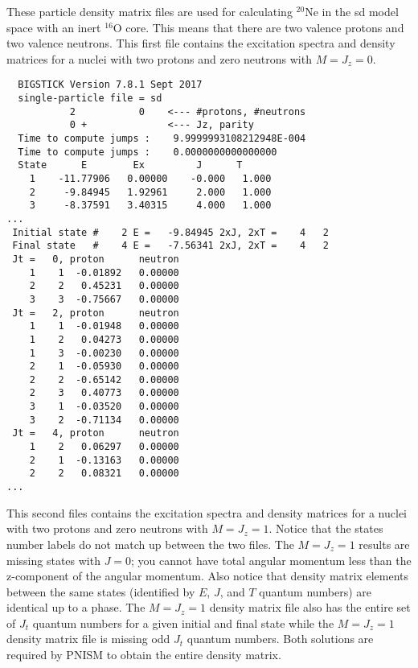 These particle density matrix files are
used for calculating $^{20}$Ne in the sd model space with an inert $^{16}$O core. This means
that there are two valence protons and two valence neutrons. This first file
contains the excitation spectra and density matrices for a nuclei with
two protons and zero neutrons with $M=J_z=0$.
\begin{verbatim}
  BIGSTICK Version 7.8.1 Sept 2017
  single-particle file = sd
           2           0    <--- #protons, #neutrons
           0 +              <--- Jz, parity
  Time to compute jumps :    9.9999993108212948E-004
  Time to compute jumps :    0.0000000000000000     
  State      E        Ex         J      T 
    1    -11.77906   0.00000    -0.000   1.000
    2     -9.84945   1.92961     2.000   1.000
    3     -8.37591   3.40315     4.000   1.000
...
 Initial state #    2 E =   -9.84945 2xJ, 2xT =    4   2
 Final state   #    4 E =   -7.56341 2xJ, 2xT =    4   2
 Jt =   0, proton      neutron 
    1    1  -0.01892   0.00000
    2    2   0.45231   0.00000
    3    3  -0.75667   0.00000
 Jt =   2, proton      neutron 
    1    1  -0.01948   0.00000
    1    2   0.04273   0.00000
    1    3  -0.00230   0.00000
    2    1  -0.05930   0.00000
    2    2  -0.65142   0.00000
    2    3   0.40773   0.00000
    3    1  -0.03520   0.00000
    3    2  -0.71134   0.00000
 Jt =   4, proton      neutron 
    1    2   0.06297   0.00000
    2    1  -0.13163   0.00000
    2    2   0.08321   0.00000
...
\end{verbatim}
This second files contains the excitation spectra and density matrices for a nuclei with
two protons and zero neutrons with $M=J_z=1$. Notice that the states number labels
do not match up between the two files. The $M=J_z=1$ results are missing states
with $J=0$; you cannot have total angular momentum less than the z-component of
the angular momentum. Also notice that density matrix elements between the same
states (identified by $E$, $J$, and $T$ quantum numbers) are identical up to a 
phase. The $M=J_z=1$ density matrix file also has the entire set of $J_t$ quantum
numbers for a given initial and final state while the $M=J_z=1$ density matrix 
file is missing odd $J_t$ quantum numbers. Both solutions are required by PNISM
to obtain the entire density matrix.
